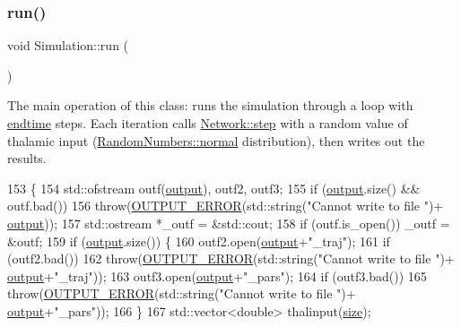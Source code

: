 \subsubsection{\texorpdfstring{run()}{run()}}
{\footnotesize\ttfamily void Simulation\+::run (\begin{DoxyParamCaption}{ }\end{DoxyParamCaption})}

The main operation of this class\+: runs the simulation through a loop with \hyperlink{classSimulation_ae57735a4ad942d9d217fb2235a644d1b}{endtime} steps. Each iteration calls \hyperlink{classNetwork_a4614f267a2238b8a10dfea23b54defac}{Network\+::step} with a random value of thalamic input (\hyperlink{classRandomNumbers_a4ef5917200da65aa267735d389bdf995}{Random\+Numbers\+::normal} distribution), then writes out the results. 
\begin{DoxyCode}
153                      \{
154     std::ofstream outf(\hyperlink{classSimulation_a9ad4c807c6ddf9066041f764f0ccb9dc}{output}), outf2, outf3;
155     \textcolor{keywordflow}{if} (\hyperlink{classSimulation_a9ad4c807c6ddf9066041f764f0ccb9dc}{output}.size() && outf.bad()) 
156         \textcolor{keywordflow}{throw}(\hyperlink{classOUTPUT__ERROR}{OUTPUT\_ERROR}(std::string(\textcolor{stringliteral}{"Cannot write to file "})+
      \hyperlink{classSimulation_a9ad4c807c6ddf9066041f764f0ccb9dc}{output}));
157     std::ostream *\_outf = &std::cout;
158     \textcolor{keywordflow}{if} (outf.is\_open()) \_outf = &outf;
159     \textcolor{keywordflow}{if} (\hyperlink{classSimulation_a9ad4c807c6ddf9066041f764f0ccb9dc}{output}.size()) \{
160         outf2.open(\hyperlink{classSimulation_a9ad4c807c6ddf9066041f764f0ccb9dc}{output}+\textcolor{stringliteral}{"\_traj"});
161         \textcolor{keywordflow}{if} (outf2.bad())
162             \textcolor{keywordflow}{throw}(\hyperlink{classOUTPUT__ERROR}{OUTPUT\_ERROR}(std::string(\textcolor{stringliteral}{"Cannot write to file "})+
      \hyperlink{classSimulation_a9ad4c807c6ddf9066041f764f0ccb9dc}{output}+\textcolor{stringliteral}{"\_traj"}));
163         outf3.open(\hyperlink{classSimulation_a9ad4c807c6ddf9066041f764f0ccb9dc}{output}+\textcolor{stringliteral}{"\_pars"});
164         \textcolor{keywordflow}{if} (outf3.bad())
165             \textcolor{keywordflow}{throw}(\hyperlink{classOUTPUT__ERROR}{OUTPUT\_ERROR}(std::string(\textcolor{stringliteral}{"Cannot write to file "})+
      \hyperlink{classSimulation_a9ad4c807c6ddf9066041f764f0ccb9dc}{output}+\textcolor{stringliteral}{"\_pars"}));
166     \}
167     std::vector<double> thalinput(\hyperlink{classSimulation_ae198f9ac020ed6bc6ebbd608ab3f959d}{size});

\end{DoxyCode}
